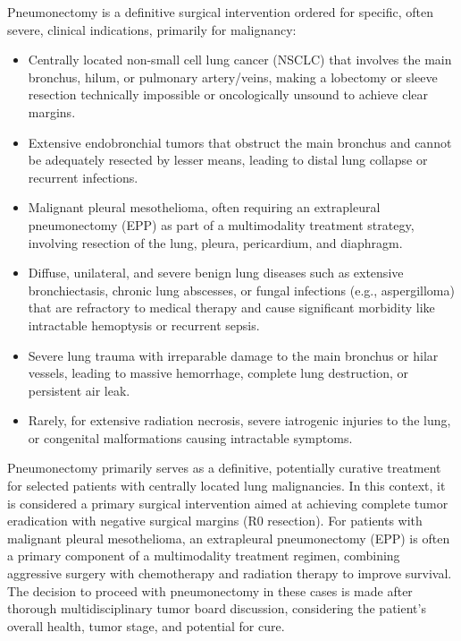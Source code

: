 Pneumonectomy is a definitive surgical intervention ordered for specific, often severe, clinical indications, primarily for malignancy:

\begin{itemize}
  \item Centrally located non-small cell lung cancer (NSCLC) that involves the main bronchus, hilum, or pulmonary artery/veins, making a lobectomy or sleeve resection technically impossible or oncologically unsound to achieve clear margins.
  \item Extensive endobronchial tumors that obstruct the main bronchus and cannot be adequately resected by lesser means, leading to distal lung collapse or recurrent infections.
  \item Malignant pleural mesothelioma, often requiring an extrapleural pneumonectomy (EPP) as part of a multimodality treatment strategy, involving resection of the lung, pleura, pericardium, and diaphragm.
  \item Diffuse, unilateral, and severe benign lung diseases such as extensive bronchiectasis, chronic lung abscesses, or fungal infections (e.g., aspergilloma) that are refractory to medical therapy and cause significant morbidity like intractable hemoptysis or recurrent sepsis.
  \item Severe lung trauma with irreparable damage to the main bronchus or hilar vessels, leading to massive hemorrhage, complete lung destruction, or persistent air leak.
  \item Rarely, for extensive radiation necrosis, severe iatrogenic injuries to the lung, or congenital malformations causing intractable symptoms.
\end{itemize}

Pneumonectomy primarily serves as a definitive, potentially curative treatment for selected patients with centrally located lung malignancies. In this context, it is considered a primary surgical intervention aimed at achieving complete tumor eradication with negative surgical margins (R0 resection). For patients with malignant pleural mesothelioma, an extrapleural pneumonectomy (EPP) is often a primary component of a multimodality treatment regimen, combining aggressive surgery with chemotherapy and radiation therapy to improve survival. The decision to proceed with pneumonectomy in these cases is made after thorough multidisciplinary tumor board discussion, considering the patient's overall health, tumor stage, and potential for cure.

